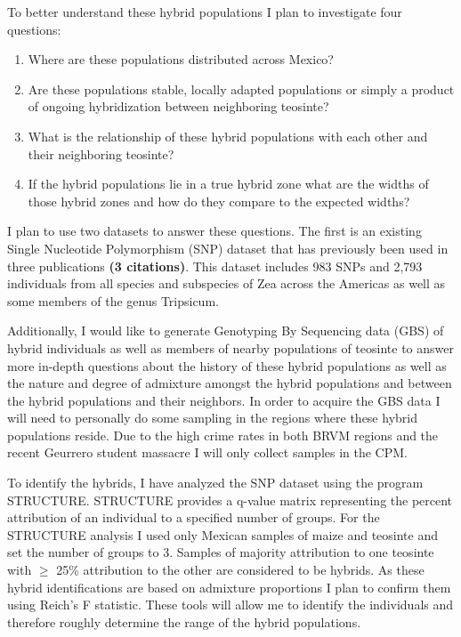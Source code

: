 \documentclass[12pt]{amsart}
\begin{document}
To better understand these hybrid populations I plan to investigate four questions: 
\begin{enumerate} 
	\item Where are these populations distributed across Mexico? 
	\item Are these populations stable, locally adapted populations or simply a product of ongoing hybridization between neighboring teosinte?
	\item What is the relationship of these hybrid populations with each other and their neighboring teosinte?
	\item If the hybrid populations lie in a true hybrid zone what are the widths of those hybrid zones and how do they compare to the expected widths?
\end{enumerate} 

I plan to use two datasets to answer these questions.  
The first is an existing Single Nucleotide Polymorphism (SNP) dataset that has previously been used in three publications \textbf{(3 citations)}.  
This dataset includes 983 SNPs and 2,793 individuals from all species and subspecies of Zea across the Americas as well as some members of the genus Tripsicum.  

Additionally, I would like to generate Genotyping By Sequencing data (GBS) of hybrid individuals as well as members of nearby populations of teosinte to answer more in-depth questions about the history of these hybrid populations as well as the nature and degree of admixture amongst the hybrid populations and between the hybrid populations and their neighbors.  
In order to acquire the GBS data I will need to personally do some sampling in the regions where these hybrid populations reside.  
Due to the high crime rates in both BRVM regions and the recent Geurrero student massacre I will only collect samples in the CPM.%

To identify the hybrids, I have analyzed the SNP dataset using the program STRUCTURE.  STRUCTURE provides a q-value matrix representing the percent attribution of an individual to a specified number of groups.  
For the STRUCTURE analysis I used only Mexican samples of maize and teosinte and set the number of groups to 3.
Samples of majority attribution to one teosinte with $\geq$ 25\% attribution to the other are considered to be hybrids.
As these hybrid identifications are based on admixture proportions I plan to confirm them using Reich's F statistic.
These tools will allow me to identify the individuals and therefore roughly determine the range of the hybrid populations.
\end{document}
